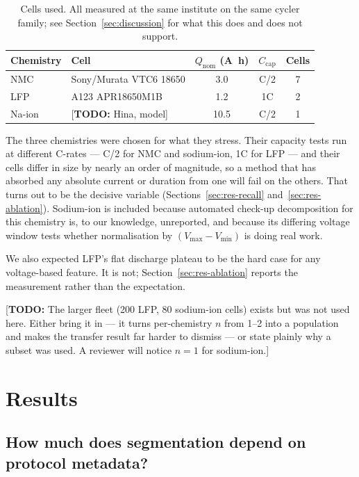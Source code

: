 \documentclass[preprint,3p,number]{elsarticle}
\newif\ifdraft\drafttrue
\newcommand{\todo}[1]{\ifdraft\textcolor{red!60!black}{[\textbf{TODO:} #1]}\fi}
\begin{document}
\begin{table}[t]
\centering
\caption{Cells used. All measured at the same institute on the same cycler
family; see Section~\ref{sec:discussion} for what this does and does not
support.}
\label{tab:cells}
\begin{tabular}{llccc}
\toprule
Chemistry & Cell & $Q_{\mathrm{nom}}$ (\si{\ampere\hour}) & $C_{\mathrm{cap}}$ & Cells \\
\midrule
NMC & Sony/Murata VTC6 18650 & 3.0 & C/2 & 7 \\
LFP & A123 APR18650M1B & 1.2 & 1C & 2 \\
Na-ion & \todo{Hina, model} & 10.5 & C/2 & 1 \\
\bottomrule
\end{tabular}
\end{table}

The three chemistries were chosen for what they stress. Their capacity tests run
at different C-rates --- C/2 for NMC and sodium-ion, 1C for LFP --- and their
cells differ in size by nearly an order of magnitude, so a method that has
absorbed any absolute current or duration from one will fail on the others.
That turns out to be the decisive variable (Sections~\ref{sec:res-recall}
and~\ref{sec:res-ablation}). Sodium-ion is included because automated check-up
decomposition for this chemistry is, to our knowledge, unreported, and because
its differing voltage window tests whether normalisation by
$(V_{\max}-V_{\min})$ is doing real work.

We also expected LFP's flat discharge plateau to be the hard case for any
voltage-based feature. It is not; Section~\ref{sec:res-ablation} reports the
measurement rather than the expectation.

\todo{The larger fleet (\num{200} LFP, \num{80} sodium-ion cells) exists but was
not used here. Either bring it in --- it turns per-chemistry $n$ from 1--2 into a
population and makes the transfer result far harder to dismiss --- or state
plainly why a subset was used. A reviewer will notice $n=1$ for sodium-ion.}

\section{Results}
\label{sec:results}

\subsection{How much does segmentation depend on protocol metadata?}
\label{sec:res-metadata}
\end{document}
